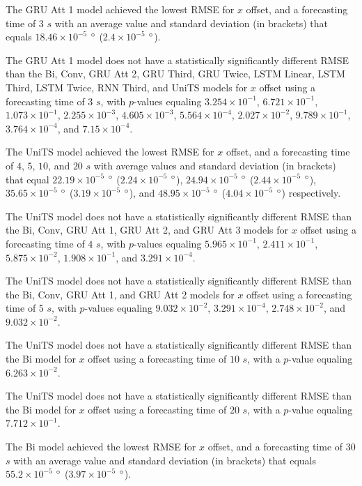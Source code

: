 \documentclass[preprint,12pt]{elsarticle}
\begin{document}
The GRU Att 1 model achieved the lowest RMSE for $x$ offset, and a forecasting time of $3$ $s$ with an average value and standard deviation (in brackets) that equals $18.46 \times 10^{-5}$ $\degree$ ($2.4 \times 10^{-5}$ $\degree$).

The GRU Att 1 model does not have a statistically significantly different RMSE than the Bi, Conv, GRU Att 2, GRU Third, GRU Twice, LSTM Linear, LSTM Third, LSTM Twice, RNN Third, and UniTS models for $x$ offset using a forecasting time of $3$ $s$, with $p$-values equaling $3.254 \times 10^{-1}$, $6.721 \times 10^{-1}$, $1.073 \times 10^{-1}$, $2.255 \times 10^{-3}$, $4.605 \times 10^{-3}$, $5.564 \times 10^{-4}$, $2.027 \times 10^{-2}$, $9.789 \times 10^{-1}$, $3.764 \times 10^{-4}$, and $7.15 \times 10^{-4}$.

The UniTS model achieved the lowest RMSE for $x$ offset, and a forecasting time of $4$, $5$, $10$, and $20$ $s$ with average values and standard deviation (in brackets) that equal $22.19 \times 10^{-5}$ $\degree$ ($2.24 \times 10^{-5}$ $\degree$), $24.94 \times 10^{-5}$ $\degree$ ($2.44 \times 10^{-5}$ $\degree$), $35.65 \times 10^{-5}$ $\degree$ ($3.19 \times 10^{-5}$ $\degree$), and $48.95 \times 10^{-5}$ $\degree$ ($4.04 \times 10^{-5}$ $\degree$) respectively.

The UniTS model does not have a statistically significantly different RMSE than the Bi, Conv, GRU Att 1, GRU Att 2, and GRU Att 3 models for $x$ offset using a forecasting time of $4$ $s$, with $p$-values equaling $5.965 \times 10^{-1}$, $2.411 \times 10^{-1}$, $5.875 \times 10^{-2}$, $1.908 \times 10^{-1}$, and $3.291 \times 10^{-4}$.

The UniTS model does not have a statistically significantly different RMSE than the Bi, Conv, GRU Att 1, and GRU Att 2 models for $x$ offset using a forecasting time of $5$ $s$, with $p$-values equaling $9.032 \times 10^{-2}$, $3.291 \times 10^{-4}$, $2.748 \times 10^{-2}$, and $9.032 \times 10^{-2}$.

The UniTS model does not have a statistically significantly different RMSE than the Bi model for $x$ offset using a forecasting time of $10$ $s$, with a $p$-value equaling $6.263 \times 10^{-2}$.

The UniTS model does not have a statistically significantly different RMSE than the Bi model for $x$ offset using a forecasting time of $20$ $s$, with a $p$-value equaling $7.712 \times 10^{-1}$.

The Bi model achieved the lowest RMSE for $x$ offset, and a forecasting time of $30$ $s$ with an average value and standard deviation (in brackets) that equals $55.2 \times 10^{-5}$ $\degree$ ($3.97 \times 10^{-5}$ $\degree$).
\end{document}
